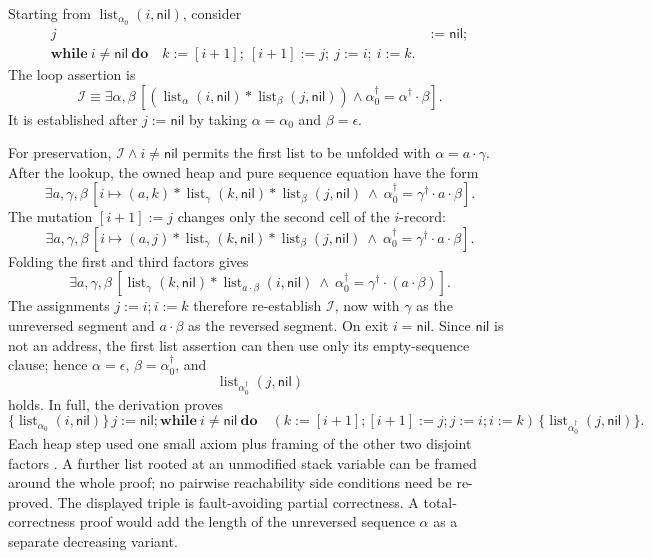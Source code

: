 Starting from \(\operatorname{list}_{\alpha_0}(i,\mathsf{nil})\), consider
\[
\begin{split}
 j&:=\mathsf{nil};\\
 \mathbf{while}\ i\neq\mathsf{nil}\ \mathbf{do}\quad
   k:=[i+1];\ [i+1]:=j;\ j:=i;\ i:=k .
\end{split}
\]
The loop assertion is
\[
 \mathcal I\equiv
 \exists\alpha,\beta\,
 \left[
  \left(
   \operatorname{list}_{\alpha}(i,\mathsf{nil})*
   \operatorname{list}_{\beta}(j,\mathsf{nil})
  \right)
  \land
  \alpha_0^\dagger=\alpha^\dagger\cdot\beta
 \right].
\]
It is established after \(j:=\mathsf{nil}\) by taking
\(\alpha=\alpha_0\) and \(\beta=\epsilon\).

For preservation, \(\mathcal I\land i\neq\mathsf{nil}\) permits the first list
to be unfolded with \(\alpha=a\cdot\gamma\).  After the lookup, the owned heap
and pure sequence equation have the form
\[
 \exists a,\gamma,\beta\,
 \left[
  i\mapsto(a,k)*
  \operatorname{list}_{\gamma}(k,\mathsf{nil})*
  \operatorname{list}_{\beta}(j,\mathsf{nil})
  \ \land\
  \alpha_0^\dagger=\gamma^\dagger\cdot a\cdot\beta
 \right].
\]
The mutation \([i+1]:=j\) changes only the second cell of the \(i\)-record:
\[
 \exists a,\gamma,\beta\,
 \left[
  i\mapsto(a,j)*
  \operatorname{list}_{\gamma}(k,\mathsf{nil})*
  \operatorname{list}_{\beta}(j,\mathsf{nil})
  \ \land\
  \alpha_0^\dagger=\gamma^\dagger\cdot a\cdot\beta
 \right].
\]
Folding the first and third factors gives
\[
 \exists a,\gamma,\beta\,
 \left[
  \operatorname{list}_{\gamma}(k,\mathsf{nil})*
  \operatorname{list}_{a\cdot\beta}(i,\mathsf{nil})
  \ \land\
  \alpha_0^\dagger=\gamma^\dagger\cdot(a\cdot\beta)
 \right].
\]
The assignments \(j:=i;i:=k\) therefore re-establish \(\mathcal I\), now with
\(\gamma\) as the unreversed segment and \(a\cdot\beta\) as the reversed
segment.  On exit \(i=\mathsf{nil}\).  Since \(\mathsf{nil}\) is not an
address, the first list assertion can then use only its empty-sequence clause;
hence \(\alpha=\epsilon\), \(\beta=\alpha_0^\dagger\), and
\[
 \operatorname{list}_{\alpha_0^\dagger}(j,\mathsf{nil})
\]
holds.  In full, the derivation proves
\[
 \{\operatorname{list}_{\alpha_0}(i,\mathsf{nil})\}\,
 j:=\mathsf{nil};
 \mathbf{while}\ i\neq\mathsf{nil}\ \mathbf{do}\quad
   (k:=[i+1];[i+1]:=j;j:=i;i:=k)\,
 \{\operatorname{list}_{\alpha_0^\dagger}(j,\mathsf{nil})\}.
\]
Each heap step used one small axiom plus framing of the other two
disjoint factors \cite[pp.~63--65]{ReynoldsSeparation2002}.  A further list
rooted at an unmodified stack variable can be framed around the whole proof;
no pairwise reachability side conditions need be re-proved.  The displayed
triple is fault-avoiding partial correctness.  A total-correctness proof would
add the length of the unreversed sequence \(\alpha\) as a separate decreasing
variant.

